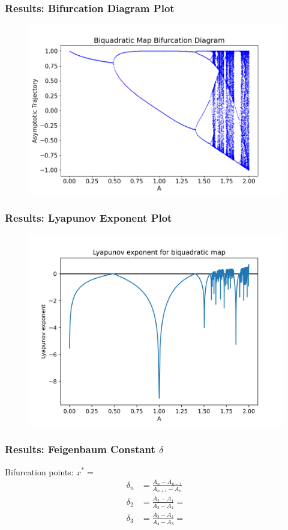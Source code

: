 \documentclass[
	11pt, %
	aspectratio=169, %
]{beamer}
\begin{document}

\begin{frame}
        \frametitle{Results: Bifurcation Diagram Plot}
        \begin{figure}
            \includegraphics[width=0.6\linewidth]
            {biquadratic_bifurcation_diagram.png}
        \end{figure}
\end{frame}


\begin{frame}
        \frametitle{Results: Lyapunov Exponent Plot}
        \begin{figure}
            \includegraphics[width=0.6\linewidth]
            {biquadratic_lyapunov_exp.png}
        \end{figure}
\end{frame}


\begin{frame}
    \frametitle{Results: Feigenbaum Constant $\delta$}
    Bifurcation points: $x^* = $ \pause
    \begin{align*}
        \delta_{n} &= \frac{A_{n}-A_{n-1}}{A_{n+1}-A_{n}} \\
        \delta_{2} &= \frac{A_{2}-A_{1}}{A_{3}-A_{2}} =  \\
        \delta_{3} &= \frac{A_{3}-A_{2}}{A_{4}-A_{3}} = 
    \end{align*}
\end{frame}
\end{document}
